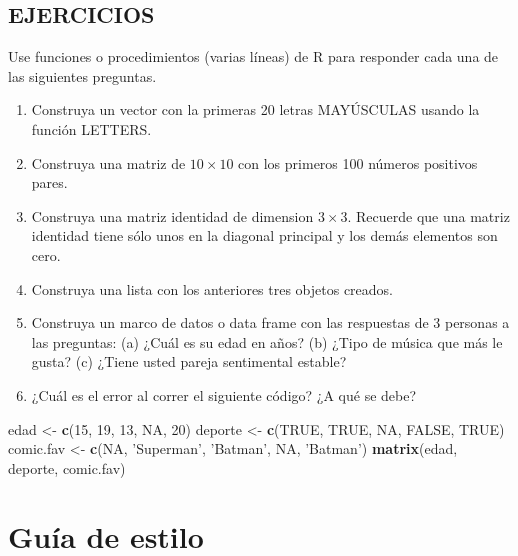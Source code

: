 \documentclass[10pt,]{krantz}
\makeatletter
\newenvironment{Shaded}{\begin{snugshade}}{\end{snugshade}}
\newcommand{\KeywordTok}[1]{\textcolor[rgb]{0.13,0.29,0.53}{\textbf{{#1}}}}
\newcommand{\DecValTok}[1]{\textcolor[rgb]{0.00,0.00,0.81}{{#1}}}
\newcommand{\StringTok}[1]{\textcolor[rgb]{0.31,0.60,0.02}{{#1}}}
\newcommand{\OtherTok}[1]{\textcolor[rgb]{0.56,0.35,0.01}{{#1}}}
\newcommand{\NormalTok}[1]{{#1}}
\let\proglang=\textsf
\newenvironment{kframe}{%
\medskip{}
\setlength{\fboxsep}{.8em}
 \def\at@end@of@kframe{}%
 \ifinner\ifhmode%
  \def\at@end@of@kframe{\end{minipage}}%
  \begin{minipage}{\columnwidth}%
 \fi\fi%
 \def\FrameCommand##1{\hskip\@totalleftmargin \hskip-\fboxsep
 \colorbox{shadecolor}{##1}\hskip-\fboxsep
     \hskip-\linewidth \hskip-\@totalleftmargin \hskip\columnwidth}%
 \MakeFramed {\advance\hsize-\width
   \@totalleftmargin\z@ \linewidth\hsize
   \@setminipage}}%
 {\par\unskip\endMakeFramed%
 \at@end@of@kframe}
\renewenvironment{Shaded}{\begin{kframe}}{\end{kframe}}
\makeatother
\begin{document}
\section*{EJERCICIOS}\label{ejercicios}


Use funciones o procedimientos (varias líneas) de \proglang{R} para
responder cada una de las siguientes preguntas.

\begin{enumerate}
\def\labelenumi{\arabic{enumi}.}
\item
  Construya un vector con la primeras 20 letras MAYÚSCULAS usando la
  función LETTERS.
\item
  Construya una matriz de \(10 \times 10\) con los primeros 100 números
  positivos pares.
\item
  Construya una matriz identidad de dimension \(3 \times 3\). Recuerde
  que una matriz identidad tiene sólo unos en la diagonal principal y
  los demás elementos son cero.
\item
  Construya una lista con los anteriores tres objetos creados.
\item
  Construya un marco de datos o data frame con las respuestas de 3
  personas a las preguntas: (a) ¿Cuál es su edad en años? (b) ¿Tipo de
  música que más le gusta? (c) ¿Tiene usted pareja sentimental estable?
\item
  ¿Cuál es el error al correr el siguiente código? ¿A qué se debe?
\end{enumerate}

\begin{Shaded}
\begin{Highlighting}[]
\NormalTok{edad <-}\StringTok{ }\KeywordTok{c}\NormalTok{(}\DecValTok{15}\NormalTok{, }\DecValTok{19}\NormalTok{, }\DecValTok{13}\NormalTok{, }\OtherTok{NA}\NormalTok{, }\DecValTok{20}\NormalTok{)}
\NormalTok{deporte <-}\StringTok{ }\KeywordTok{c}\NormalTok{(}\OtherTok{TRUE}\NormalTok{, }\OtherTok{TRUE}\NormalTok{, }\OtherTok{NA}\NormalTok{, }\OtherTok{FALSE}\NormalTok{, }\OtherTok{TRUE}\NormalTok{)}
\NormalTok{comic.fav <-}\StringTok{ }\KeywordTok{c}\NormalTok{(}\OtherTok{NA}\NormalTok{, }\StringTok{'Superman'}\NormalTok{, }\StringTok{'Batman'}\NormalTok{, }\OtherTok{NA}\NormalTok{, }\StringTok{'Batman'}\NormalTok{)}
\KeywordTok{matrix}\NormalTok{(edad, deporte, comic.fav)}
\end{Highlighting}
\end{Shaded}

\chapter{\texorpdfstring{Guía de estilo 
\label{estilo}}{Guía de estilo  }}\label{guia-de-estilo}
\end{document}
